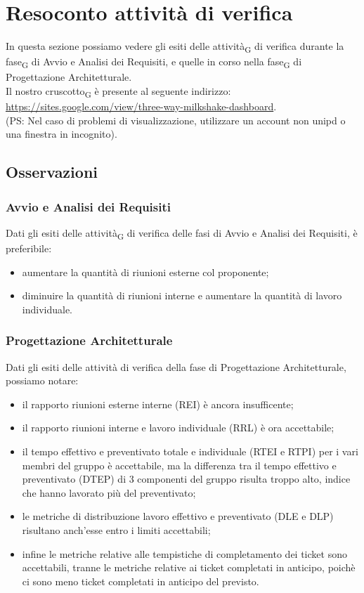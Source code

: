 
\section{Resoconto {attività} di verifica}
In questa sezione possiamo vedere gli esiti delle attività\textsubscript{G} di verifica durante la fase\textsubscript{G} di Avvio e Analisi dei Requisiti, e quelle in corso nella fase\textsubscript{G} di Progettazione Architetturale.\\
Il nostro cruscotto\textsubscript{G} è presente al seguente indirizzo:\\ \url{https://sites.google.com/view/three-way-milkshake-dashboard}.\\ (PS: Nel caso di problemi di visualizzazione, utilizzare un account non unipd o una finestra in incognito).
\subsection{Osservazioni}
\subsubsection{Avvio e Analisi dei Requisiti}
Dati gli esiti delle attività\textsubscript{G} di verifica delle fasi di Avvio e Analisi dei Requisiti, è preferibile:
\begin{itemize}
	\item aumentare la quantità di riunioni esterne col proponente;
	\item diminuire la quantità di riunioni interne e aumentare la quantità di lavoro individuale.
\end{itemize}
\subsubsection{Progettazione Architetturale}
Dati gli esiti delle attività di verifica della fase di Progettazione Architetturale, possiamo notare:
\begin{itemize}
	\item il rapporto riunioni esterne interne (REI) è ancora insufficente;
	\item il rapporto riunioni interne e lavoro individuale (RRL) è ora accettabile;
	\item il tempo effettivo e preventivato totale e individuale (RTEI e RTPI) per i vari membri del gruppo è accettabile, ma la differenza tra il tempo effettivo e preventivato (DTEP) di 3 componenti del gruppo risulta troppo alto, indice che hanno lavorato più del preventivato;
	\item le metriche di distribuzione lavoro effettivo e preventivato (DLE e DLP) risultano anch'esse entro i limiti accettabili;
	\item infine le metriche relative alle tempistiche di completamento dei ticket sono accettabili, tranne le metriche relative ai ticket completati in anticipo, poichè ci sono meno ticket completati in anticipo del previsto.
\end{itemize}